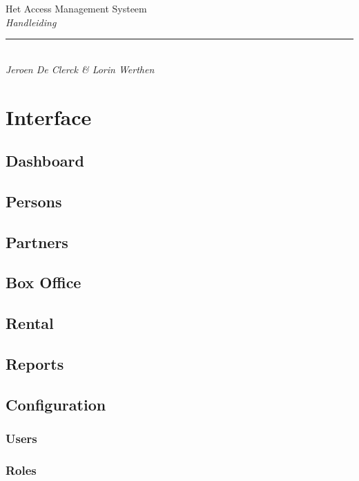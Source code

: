 \documentclass[]{memoir}
\begin{document}
\begingroup%
\centering
\vspace*{0.1\textheight}
{\Huge Het Access Management Systeem}\\[\baselineskip]
{\large\itshape Handleiding}\\[\baselineskip]
\vfill
\rule{0.4\textwidth}{0.4pt}\\[\baselineskip]
{\large\itshape Jeroen De Clerck \& Lorin Werthen}\par
\vspace*{0.1\textheight}
\endgroup

\clearpage
\tableofcontents

\chapter{Interface}

\section{Dashboard}

\section{Persons}

\section{Partners}

\section{Box Office}

\section{Rental}

\section{Reports}

\section{Configuration}
\subsection{Users}
\subsection{Roles}
\end{document}
